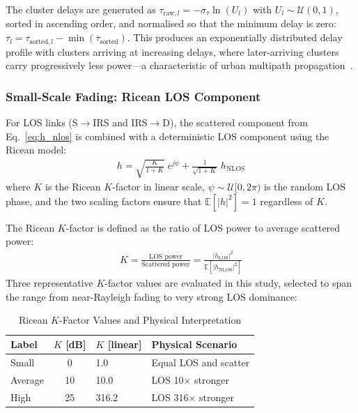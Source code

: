 \documentclass[journal]{IEEEtran} %
\begin{document}
The cluster delays are generated as $\tau_{\mathrm{raw},l} = -\sigma_\tau \ln(U_l)$ with $U_l \sim \mathcal{U}(0,1)$, sorted in ascending order, and normalised so that the minimum delay is zero: $\tau_l = \tau_{\mathrm{sorted},l} - \min(\tau_{\mathrm{sorted}})$. This produces an exponentially distributed delay profile with clusters arriving at increasing delays, where later-arriving clusters carry progressively less power---a characteristic of urban multipath propagation~\cite{rappaport2015mmwave,samimi2016mmwave_scm}.

\subsubsection{Small-Scale Fading: Ricean LOS Component}

For LOS links (S$\to$IRS and IRS$\to$D), the scattered component from Eq.~\eqref{eq:h_nlos} is combined with a deterministic LOS component using the Ricean model:
\begin{align}
    h = \sqrt{\frac{K}{1+K}}\;e^{j\psi} + \frac{1}{\sqrt{1+K}}\;h_{\mathrm{NLOS}}
    \label{eq:h_ricean}
\end{align}
where $K$ is the Ricean $K$-factor in linear scale, $\psi \sim \mathcal{U}[0, 2\pi)$ is the random LOS phase, and the two scaling factors ensure that $\mathbb{E}[|h|^2] = 1$ regardless of $K$.

The Ricean $K$-factor is defined as the ratio of LOS power to average scattered power:
\begin{align}
    K = \frac{\text{LOS power}}{\text{Scattered power}} = \frac{|h_{\mathrm{LOS}}|^2}{\mathbb{E}\!\left[|h_{\mathrm{NLOS}}|^2\right]}
    \label{eq:k_factor_def}
\end{align}
Three representative $K$-factor values are evaluated in this study, selected to span the range from near-Rayleigh fading to very strong LOS dominance:

\begin{table}[t]
\centering
\caption{Ricean $K$-Factor Values and Physical Interpretation}
\label{tab:k_factor_values}
\begin{tabular}{@{}lcll@{}}
\toprule
Label & $K$ [dB] & $K$ [linear] & Physical Scenario \\
\midrule
Small   & 0  & 1.0   & Equal LOS and scatter  \\
Average & 10 & 10.0  & LOS 10$\times$ stronger  \\
High    & 25 & 316.2 & LOS 316$\times$ stronger \\
\bottomrule
\end{tabular}
\end{table}
\end{document}
